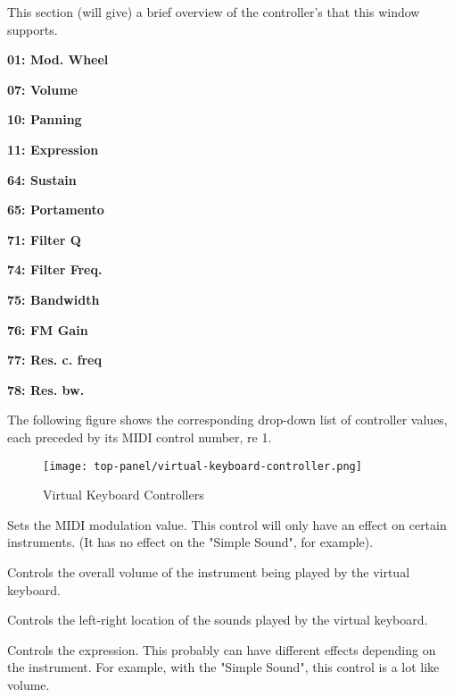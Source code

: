    This section (will give) a brief overview of the controller's that this
   window supports.

   \begin{enumber}
      \item \textbf{01: Mod. Wheel}
      \item \textbf{07: Volume}
      \item \textbf{10: Panning}
      \item \textbf{11: Expression}
      \item \textbf{64: Sustain}
      \item \textbf{65: Portamento}
      \item \textbf{71: Filter Q}
      \item \textbf{74: Filter Freq.}
      \item \textbf{75: Bandwidth}
      \item \textbf{76: FM Gain}
      \item \textbf{77: Res. c. freq}
      \item \textbf{78: Res. bw.}
   \end{enumber}

      The following figure shows the corresponding drop-down list of controller
      values, each preceded by its MIDI control number, re 1.

\begin{figure}[H]
   \centering
   \texttt{[image: top-panel/virtual-keyboard-controller.png]}
   \caption{Virtual Keyboard Controllers}
   \label{fig:virtual_keyboard_controllers}
\end{figure}

   \setcounter{ItemCounter}{0}      %

   Sets the MIDI modulation value.  This control will
   only have an effect on certain instruments.  (It has no effect on the
   "Simple Sound", for example).

   Controls the overall volume of the instrument being played by the virtual
   keyboard.

   Controls the left-right location of the sounds played by the virtual
   keyboard.

   Controls the expression.  This probably can have different effects depending
   on the instrument.  For example, with the "Simple Sound", this control is a
   lot like volume.

